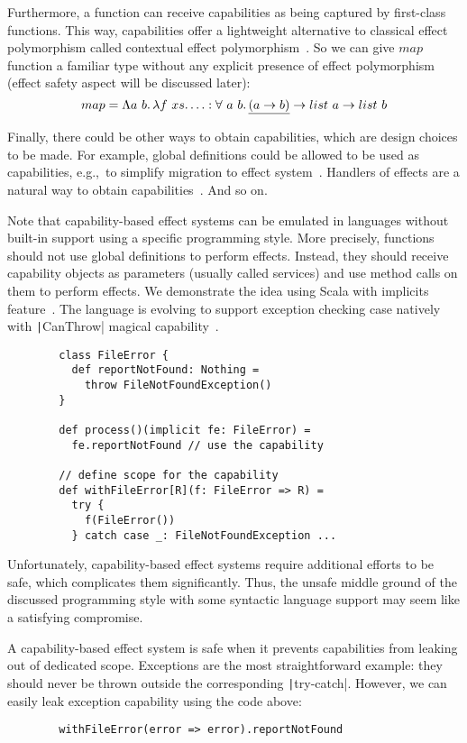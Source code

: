 \documentclass[conference]{IEEEtran}
\newcommand{\ap}{~}
\begin{document}
    Furthermore, a function can receive capabilities as being captured by first-class functions.
    This way, capabilities offer a lightweight alternative to classical effect polymorphism called contextual effect polymorphism~\cite{brachthauser2022effects}.
    So we can give $map$ function a familiar type without any explicit presence of effect polymorphism (effect safety aspect will be discussed later):
    \[map = \Lambda a \ap b\ldotp \lambda f\ap xs\ldotp \ldots : \forall \ap a \ap b\ldotp \underline{(a \to b)} \to list \ap a \to list \ap b \]

    Finally, there could be other ways to obtain capabilities, which are design choices to be made.
    For example, global definitions could be allowed to be used as capabilities, e.g.,\ to simplify migration to effect system~\cite{brachthauser2022effects, odersky2022scoped}.
    Handlers of effects are a natural way to obtain capabilities~\cite{brachthauser2020effects}.
    And so on.


    Note that capability-based effect systems can be emulated in languages without built-in support using a specific programming style.
    More precisely, functions should not use global definitions to perform effects.
    Instead, they should receive capability objects as parameters (usually called services) and use method calls on them to perform effects.
    We demonstrate the idea using Scala with implicits feature~\cite{odersky2004scala}.
    The language is evolving to support exception checking case natively with \texttt|CanThrow| magical capability~\cite{odersky2021safer}.
    \begin{verbatim}
        class FileError {
          def reportNotFound: Nothing =
            throw FileNotFoundException()
        }

        def process()(implicit fe: FileError) =
          fe.reportNotFound // use the capability

        // define scope for the capability
        def withFileError[R](f: FileError => R) =
          try {
            f(FileError())
          } catch case _: FileNotFoundException ...
    \end{verbatim}


    Unfortunately, capability-based effect systems require additional efforts to be safe, which complicates them significantly.
    Thus, the unsafe middle ground of the discussed programming style with some syntactic language support may seem like a satisfying compromise.

    A capability-based effect system is safe when it prevents capabilities from leaking out of dedicated scope.
    Exceptions are the most straightforward example: they should never be thrown outside the corresponding \texttt|try-catch|.
    However, we can easily leak exception capability using the code above:
    \begin{verbatim}
        withFileError(error => error).reportNotFound
    \end{verbatim}
\end{document}
